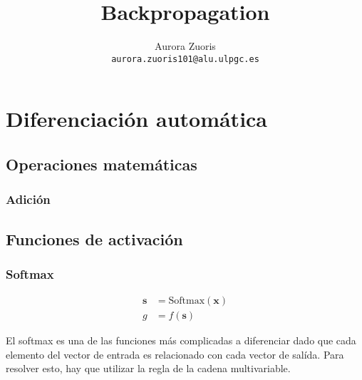 \documentclass{article}
\title{Backpropagation}
\author{Aurora Zuoris \\ \texttt{aurora.zuoris101@alu.ulpgc.es}}
\begin{document}
\maketitle



\section{Diferenciación automática}

\subsection{Operaciones matemáticas}

\subsubsection*{Adición}

\newpage

\subsection{Funciones de activación}

\subsubsection*{Softmax}

\begin{align*}
	\bm{s} &= \text{Softmax}(\bm{x}) \\
	g &= f(\bm{s})
\end{align*}

El softmax es una de las funciones más complicadas a diferenciar
dado que cada elemento del vector de entrada es relacionado con
cada vector de salída.
Para resolver esto, hay que utilizar la regla de la cadena multivariable.

\def\empty{null}
\end{document}
